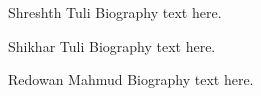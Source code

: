 \documentclass[10pt,journal,compsoc]{IEEEtran}
\begin{document}
% 

\begin{IEEEbiography}{Shreshth Tuli}
Biography text here.
\end{IEEEbiography}

\begin{IEEEbiographynophoto}{Shikhar Tuli}
Biography text here.
\end{IEEEbiographynophoto}


\begin{IEEEbiographynophoto}{Redowan Mahmud}
Biography text here.
\end{IEEEbiographynophoto}






\end{document}
